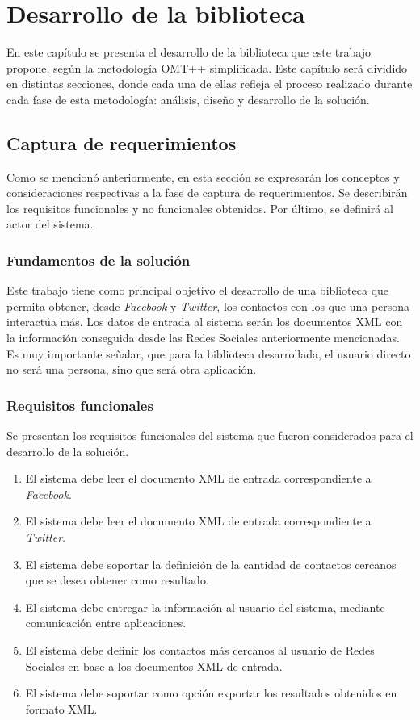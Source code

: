 \chapter{Desarrollo de la biblioteca}
\label{cap:desarrollo}

En este capítulo se presenta el desarrollo de la biblioteca que este trabajo propone, según la metodología OMT++ simplificada. Este capítulo será dividido en distintas secciones, donde cada una de ellas refleja el proceso realizado durante cada fase de esta metodología: análisis, diseño y desarrollo de la solución.

\section{Captura de requerimientos}
Como se mencionó anteriormente, en esta sección se expresarán los conceptos y consideraciones respectivas a la fase de captura de requerimientos. Se describirán los requisitos funcionales y no funcionales obtenidos. Por último, se definirá al actor del sistema.

\subsection{Fundamentos de la soluci\'on}

Este trabajo tiene como principal objetivo el desarrollo de una biblioteca que permita obtener, desde \textit{Facebook} y \textit{Twitter}, los contactos con los que una persona interactúa más. Los datos de entrada al sistema serán los documentos XML con la información conseguida desde las Redes Sociales anteriormente mencionadas. Es muy importante señalar, que para la biblioteca desarrollada, el usuario directo no será una persona, sino que será otra aplicación. 

\subsection{Requisitos funcionales}
\label{functional}
Se presentan los requisitos funcionales del sistema que fueron considerados para el desarrollo de la solución.

\begin{enumerate}
\item El sistema debe leer el documento XML de entrada correspondiente a \textit{Facebook}. 
\item El sistema debe leer el documento XML de entrada correspondiente a \textit{Twitter}.
\item El sistema debe  soportar la definición de la cantidad de contactos cercanos que se desea obtener como resultado.
\item El sistema debe entregar la información al usuario del sistema, mediante comunicación entre aplicaciones.
\item El sistema debe definir los contactos más cercanos al usuario de Redes Sociales en base a los documentos XML de entrada.
\item El sistema debe soportar como opción exportar los resultados obtenidos en formato XML.
\end{enumerate}

